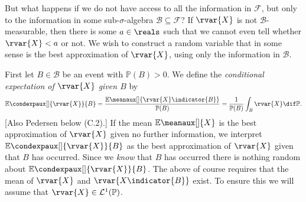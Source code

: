 \documentclass[article, a4paper, 11pt, oneside]{memoir}
\numberwithin{equation}{chapter}
\newcommand{\calB}{\mathcal{B}}
\newcommand{\calF}{\mathcal{F}}
\newcommand{\calL}{\mathcal{L}}
\renewcommand{\P}{\mathbb{P}}
\renewcommand{\mean}[2][]{\mathbb{E}\meanaux[#1]{#2}}
\newcommand{\condexp}[3][]{{\mathbb{E}\condexpaux[#1]{#2}{#3}}}
\begin{document}
But what happens if we do not have access to all the information in $\calF$, but only to the information in some sub-$\sigma$-algebra $\calB \subseteq \calF$? If $\rvar{X}$ is not $\calB$-measurable, then there is some $a \in \reals$ such that we cannot even tell whether $\rvar{X} < a$ or not. We wish to construct a random variable that in some sense is the best approximation of $\rvar{X}$, using only the information in $\calB$.

First let $B \in \calB$ be an event with $\P(B) > 0$. We define the \emph{conditional expectation of $\rvar{X}$ given $B$} by
%
\begin{equation*}
    \condexp{\rvar{X}}{B}
        = \frac{\mean{\rvar{X} \indicator{B}}}{\P(B)}
        = \frac{1}{\P(B)} \int_B \rvar{X} \dif\P.
\end{equation*}
%
[Also Pedersen below (C.2).] If the mean $\mean{X}$ is the best approximation of $\rvar{X}$ given no further information, we interpret $\condexp{\rvar{X}}{B}$ as the best approximation of $\rvar{X}$ given that $B$ has occurred. Since we \emph{know} that $B$ has occurred there is nothing random about $\condexp{\rvar{X}}{B}$. The above of course requires that the mean of $\rvar{X}$ and $\rvar{X \indicator{B}}$ exist. To ensure this we will assume that $\rvar{X} \in \calL^1(\P)$.
\end{document}
